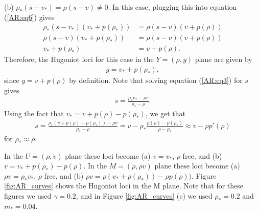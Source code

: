 \documentclass{article}
\begin{document}
(b) $\rho_*(s - v_*) = \rho (s - v) \neq 0$. In this case, plugging this into equation (\ref{AR:eq6}) gives
\begin{align*}
\rho_*(s - v_*)\left(v_* + p(\rho_* )\right) &= \rho(s - v)\left(v + p(\rho )\right)\\
\rho(s - v)\left(v_* + p(\rho_* )\right) &= \rho(s - v)\left(v + p(\rho )\right)\\
v_* + p(\rho_* )&= v + p(\rho ).
\end{align*}
Therefore, the Hugoniot loci for this case in the $Y = (\rho, y)$ plane are given by
\begin{align*}
y = v_* + p(\rho_* ),
\end{align*}
since $y = v + p(\rho )$ by definition. Note that solving equation (\ref{AR:eq3}) for $s$ gives
\begin{align*}
s = \frac{\rho_*v_* - \rho v}{\rho_* - \rho}.
\end{align*}
Using the fact that $v_* = v + p(\rho) - p(\rho_*)$, we get that
\begin{align*}
s = \frac{\rho_*\left( v + p(\rho) - p(\rho_*)\right)- \rho v}{\rho_* - \rho}
= v - \rho_*\frac{p(\rho ) - p(\rho_*)}{\rho - \rho_*}
\approx v - \rho p'(\rho)
\end{align*}
for $\rho_* \approx \rho$. 

In the $U = (\rho, v)$ plane these loci become (a) $v = v_*$, $\rho$ free, and (b) $v = v_* + p(\rho_* ) - p(\rho )$.
 In the $M = (\rho, \rho v)$ plane these loci become (a) $\rho v = \rho_* v_*$, $\rho$ free, 
 and (b) $\rho v = \rho \left( v_* + p(\rho_*)\right) - \rho p(\rho))$. Figure \ref{fig:AR_curves} shows the Hugoniot loci 
 in the M plane. Note that for these figures we used $\gamma = 0.2$, and in Figure \ref{fig:AR_curves} (c) we used $\rho_* = 0.2$ and $m_* = 0.04$.
\end{document}
